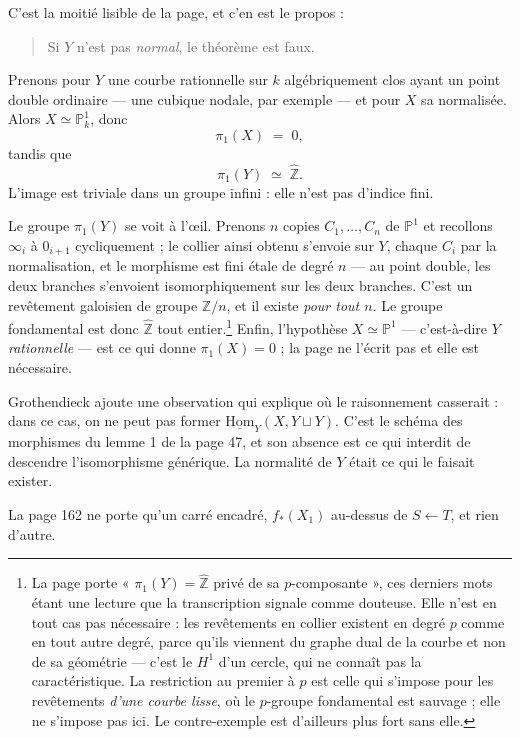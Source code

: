 \documentclass[11pt,a4paper]{article}
\begin{document}
C'est la moitié lisible de la page, et c'en est le propos :

\begin{quote}
Si $Y$ n'est pas \emph{normal}, le théorème est faux.
\end{quote}

Prenons pour $Y$ une courbe rationnelle sur $k$ algébriquement clos ayant un
point double ordinaire --- une cubique nodale, par exemple --- et pour $X$ sa
normalisée. Alors $X \simeq \mathbb{P}^{1}_{k}$, donc
\[
  \pi_{1}(X) \;=\; 0 ,
\]
tandis que
\[
  \pi_{1}(Y) \;\simeq\; \hat{\mathbb{Z}} .
\]
L'image est triviale dans un groupe infini : elle n'est pas d'indice fini.

Le groupe $\pi_{1}(Y)$ se voit à l'œil. Prenons $n$ copies
$C_{1}, \dots, C_{n}$ de $\mathbb{P}^{1}$ et recollons $\infty_{i}$ à
$0_{i+1}$ cycliquement ; le collier ainsi obtenu s'envoie sur $Y$, chaque
$C_{i}$ par la normalisation, et le morphisme est fini étale de degré $n$ ---
au point double, les deux branches s'envoient isomorphiquement sur les deux
branches. C'est un revêtement galoisien de groupe $\mathbb{Z}/n$, et il existe
\emph{pour tout $n$}. Le groupe fondamental est donc $\hat{\mathbb{Z}}$ tout
entier.\footnote{La page porte « $\pi_{1}(Y) = \hat{\mathbb{Z}}$
privé de sa $p$-composante », ces derniers mots étant une lecture que la
transcription signale comme douteuse. Elle n'est en tout cas pas nécessaire :
les revêtements en collier existent en degré $p$ comme en tout autre degré,
parce qu'ils viennent du graphe dual de la courbe et non de sa géométrie ---
c'est le $H^{1}$ d'un cercle, qui ne connaît pas la caractéristique. La
restriction au premier à $p$ est celle qui s'impose pour les revêtements
\emph{d'une courbe lisse}, où le $p$-groupe fondamental est sauvage ; elle ne
s'impose pas ici. Le contre-exemple est d'ailleurs plus fort sans elle.}
Enfin, l'hypothèse $X \simeq \mathbb{P}^{1}$ --- c'est-à-dire $Y$
\emph{rationnelle} --- est ce qui donne $\pi_{1}(X) = 0$ ; la page ne l'écrit
pas et elle est nécessaire.

Grothendieck ajoute une observation qui explique où le raisonnement casserait :
dans ce cas, on ne peut pas former $\underline{\mathrm{Hom}}_{Y}(X, Y \sqcup
Y)$. C'est le schéma des morphismes du lemme 1 de la page 47, et son absence
est ce qui interdit de descendre l'isomorphisme générique. La normalité de $Y$
était ce qui le faisait exister.

La page 162 ne porte qu'un carré encadré, $f_{*}(X_{1})$ au-dessus de
$S \leftarrow T$, et rien d'autre.
\end{document}
